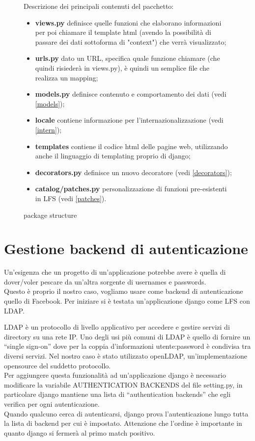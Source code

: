 \begin{figure}
\begin{minipage}{.40\textwidth}
	\caption{package structure\label{fig:package_structure}}
\end{minipage}
\begin{minipage}{.60\textwidth}
Descrizione dei principali contenuti del pacchetto:
\begin{itemize}
	\item \textbf{views.py} definisce quelle funzioni che elaborano informazioni per poi chiamare il template html (avendo la possibilità di passare dei dati sottoforma di "context") che verrà visualizzato;
	\item \textbf{urls.py} dato un URL, specifica quale funzione chiamare (che quindi risiederà in views.py), è quindi un semplice file che realizza un mapping;
	\item \textbf{models.py} definisce contenuto e comportamento dei dati (vedi \ref{models});
	\item \textbf{locale} contiene informazione per l'internazionalizzazione (vedi \ref{intern});
	\item \textbf{templates} contiene il codice html delle pagine web, utilizzando anche il linguaggio di templating proprio di django;
	\item \textbf{decorators.py} definisce un nuovo decoratore (vedi \ref{decorators});
	\item \textbf{catalog/patches.py} personalizzazione di funzioni pre-esistenti in LFS (vedi \ref{patches}).
	
\end{itemize}
\end{minipage}
\end{figure}

\section{Gestione backend di autenticazione}
Un'esigenza che un progetto di un'applicazione potrebbe avere è quella di dover/voler pescare da un'altra sorgente di usernames e passwords.\\
Questo è proprio il nostro caso, vogliamo usare come backend di autenticazione quello di Facebook.
Per iniziare si è testata un'applicazione django come LFS con LDAP. 

\vspace{2.5 mm}
LDAP è un protocollo di livello applicativo per accedere e gestire servizi di directory su una rete IP. Uno degli usi più comuni di LDAP è quello di fornire un “single sign-on” dove per la coppia d'informazioni utente:password è condivisa tra diversi servizi.
Nel nostro caso è stato utilizzato openLDAP, un'implementazione opensource del suddetto protocollo.\\
Per aggiungere questa funzionalità ad un'applicazione django è necessario modificare la variabile AUTHENTICATION BACKENDS del file setting.py, in particolare django mantiene una lista di “authentication backends” che egli verifica per ogni autenticazione.\\
Quando qualcuno cerca di autenticarsi, django prova l'autenticazione lungo tutta la lista di backend per cui è impostato. 
Attenzione che l'ordine è importante in quanto django si fermerà al primo match positivo.

